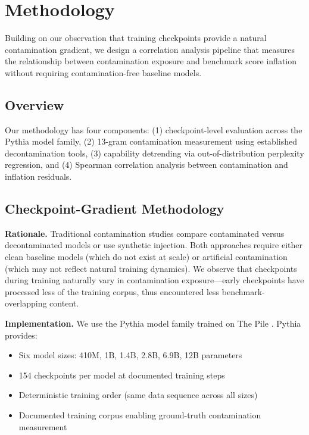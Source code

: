 \section{Methodology}

Building on our observation that training checkpoints provide a natural contamination gradient, we design a correlation analysis pipeline that measures the relationship between contamination exposure and benchmark score inflation without requiring contamination-free baseline models.

\subsection{Overview}

Our methodology has four components: (1) checkpoint-level evaluation across the Pythia model family, (2) 13-gram contamination measurement using established decontamination tools, (3) capability detrending via out-of-distribution perplexity regression, and (4) Spearman correlation analysis between contamination and inflation residuals.

\subsection{Checkpoint-Gradient Methodology}

\textbf{Rationale.} Traditional contamination studies compare contaminated versus decontaminated models or use synthetic injection. Both approaches require either clean baseline models (which do not exist at scale) or artificial contamination (which may not reflect natural training dynamics). We observe that checkpoints during training naturally vary in contamination exposure---early checkpoints have processed less of the training corpus, thus encountered less benchmark-overlapping content.

\textbf{Implementation.} We use the Pythia model family \citep{biderman2023pythia} trained on The Pile \citep{gao2020pile}. Pythia provides:
\begin{itemize}
    \item Six model sizes: 410M, 1B, 1.4B, 2.8B, 6.9B, 12B parameters
    \item 154 checkpoints per model at documented training steps
    \item Deterministic training order (same data sequence across all sizes)
    \item Documented training corpus enabling ground-truth contamination measurement
\end{itemize}

